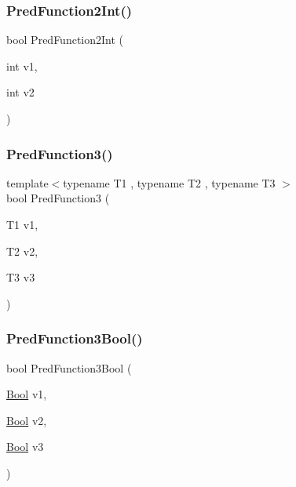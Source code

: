 \subsubsection{\texorpdfstring{PredFunction2Int()}{PredFunction2Int()}}
{\footnotesize\ttfamily bool Pred\+Function2\+Int (\begin{DoxyParamCaption}\item[{int}]{v1,  }\item[{int}]{v2 }\end{DoxyParamCaption})}

\mbox{\label{googletest-master_2googletest_2test_2gtest__pred__impl__unittest_8cc_a78a1ff258fe5a85da5b2645983311a70}} 
\subsubsection{\texorpdfstring{PredFunction3()}{PredFunction3()}}
{\footnotesize\ttfamily template$<$typename T1 , typename T2 , typename T3 $>$ \\
bool Pred\+Function3 (\begin{DoxyParamCaption}\item[{T1}]{v1,  }\item[{T2}]{v2,  }\item[{T3}]{v3 }\end{DoxyParamCaption})}

\mbox{\label{googletest-master_2googletest_2test_2gtest__pred__impl__unittest_8cc_afa4ce2143c2ffedb2fa5d5f8cff6f6e6}} 
\subsubsection{\texorpdfstring{PredFunction3Bool()}{PredFunction3Bool()}}
{\footnotesize\ttfamily bool Pred\+Function3\+Bool (\begin{DoxyParamCaption}\item[{\mbox{\hyperlink{struct_bool}{Bool}}}]{v1,  }\item[{\mbox{\hyperlink{struct_bool}{Bool}}}]{v2,  }\item[{\mbox{\hyperlink{struct_bool}{Bool}}}]{v3 }\end{DoxyParamCaption})}


